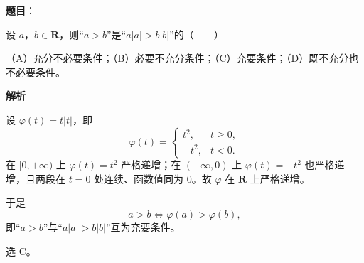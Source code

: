 \begin{answer}

\textbf{题目}：

设 $a$，$b\in\mathbf R$，则“$a>b$”是“$a|a|>b|b|$”的\mbox{（　　）}

（A）充分不必要条件；（B）必要不充分条件；（C）充要条件；（D）既不充分也不必要条件。

\textbf{解析}

设 $\varphi(t)=t|t|$，即
\nopagebreak[4]
\[\varphi(t)=\begin{cases}
t^2, & t\geqslant 0,\\
-t^2, & t<0.
\end{cases}\]
在 $[0,+\infty)$ 上 $\varphi(t)=t^2$ 严格递增；在 $(-\infty,0)$ 上 $\varphi(t)=-t^2$ 也严格递增，且两段在 $t=0$ 处连续、函数值同为 $0$。故 $\varphi$ 在 $\mathbf R$ 上严格递增。

于是
\nopagebreak[4]
\[a>b\iff \varphi(a)>\varphi(b),\]
即“$a>b$”与“$a|a|>b|b|$”互为充要条件。

选 C。


\end{answer}
